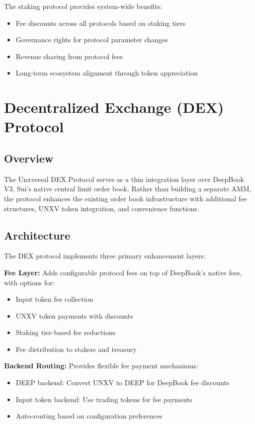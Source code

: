 \documentclass[12pt]{article}
\begin{document}
The staking protocol provides system-wide benefits:
\begin{itemize}
    \item Fee discounts across all protocols based on staking tiers
    \item Governance rights for protocol parameter changes
    \item Revenue sharing from protocol fees
    \item Long-term ecosystem alignment through token appreciation
\end{itemize}

\section{Decentralized Exchange (DEX) Protocol}

\subsection{Overview}

The Unxversal DEX Protocol serves as a thin integration layer over DeepBook V3, Sui's native central limit order book. Rather than building a separate AMM, the protocol enhances the existing order book infrastructure with additional fee structures, UNXV token integration, and convenience functions.

\subsection{Architecture}

The DEX protocol implements three primary enhancement layers:

\textbf{Fee Layer:} Adds configurable protocol fees on top of DeepBook's native fees, with options for:
\begin{itemize}
    \item Input token fee collection
    \item UNXV token payments with discounts
    \item Staking tier-based fee reductions
    \item Fee distribution to stakers and treasury
\end{itemize}

\textbf{Backend Routing:} Provides flexible fee payment mechanisms:
\begin{itemize}
    \item DEEP backend: Convert UNXV to DEEP for DeepBook fee discounts
    \item Input token backend: Use trading tokens for fee payments
    \item Auto-routing based on configuration preferences
\end{itemize}
\end{document}
